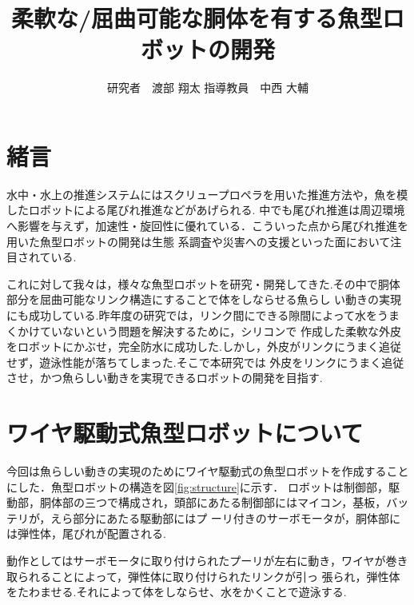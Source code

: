 \documentclass{jarticle}
\begin{document}

\title{
柔軟な/屈曲可能な胴体を有する魚型ロボットの開発
}
\author{
研究者　渡部 翔太\;\;\;
指導教員　中西 大輔
}

\maketitle

\thispagestyle{empty}  %

\section{緒言}

水中・水上の推進システムにはスクリュープロペラを用いた推進方法や，魚を模したロボットによる尾びれ推進などがあげられる\cite{ichi}.
中でも尾びれ推進は周辺環境へ影響を与えず，加速性・旋回性に優れている．こういった点から尾びれ推進を用いた魚型ロボットの開発は生態
系調査や災害への支援といった面において注目されている\cite{ni}.

これに対して我々は，様々な魚型ロボットを研究・開発してきた.その中で胴体部分を屈曲可能なリンク構造にすることで体をしならせる魚らし
い動きの実現にも成功している.昨年度の研究では，リンク間にできる隙間によって水をうまくかけていないという問題を解決するために，シリコンで
作成した柔軟な外皮をロボットにかぶせ，完全防水に成功した\cite{san}.しかし，外皮がリンクにうまく追従せず，遊泳性能が落ちてしまった.そこで本研究では
外皮をリンクにうまく追従させ，かつ魚らしい動きを実現できるロボットの開発を目指す.

\vspace*{-1mm}
\section{ワイヤ駆動式魚型ロボットについて}
今回は魚らしい動きの実現のためにワイヤ駆動式の魚型ロボットを作成することにした．魚型ロボットの構造を図\ref{fig:structure}に示す．
ロボットは制御部，駆動部，胴体部の三つで構成され，頭部にあたる制御部にはマイコン，基板，バッテリが，えら部分にあたる駆動部にはプ
ーリ付きのサーボモータが，胴体部には弾性体，尾びれが配置される.

動作としてはサーボモータに取り付けられたプーリが左右に動き，ワイヤが巻き取られることによって，弾性体に取り付けられたリンクが引っ
張られ，弾性体をたわませる.それによって体をしならせ、水をかくことで遊泳する.
\end{document}
